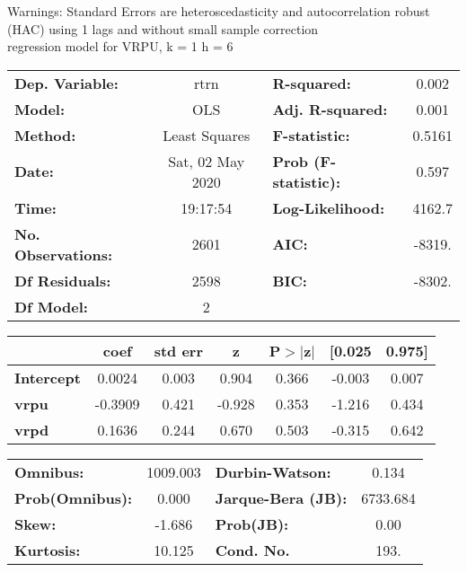 Warnings: \newline
 [1] Standard Errors are heteroscedasticity and autocorrelation robust (HAC) using 1 lags and without small sample correction\\ 

regression model for VRPU, k = 1 h = 6\begin{center}
\begin{tabular}{lclc}
\toprule
\textbf{Dep. Variable:}    &       rtrn       & \textbf{  R-squared:         } &     0.002   \\
\textbf{Model:}            &       OLS        & \textbf{  Adj. R-squared:    } &     0.001   \\
\textbf{Method:}           &  Least Squares   & \textbf{  F-statistic:       } &    0.5161   \\
\textbf{Date:}             & Sat, 02 May 2020 & \textbf{  Prob (F-statistic):} &    0.597    \\
\textbf{Time:}             &     19:17:54     & \textbf{  Log-Likelihood:    } &    4162.7   \\
\textbf{No. Observations:} &        2601      & \textbf{  AIC:               } &    -8319.   \\
\textbf{Df Residuals:}     &        2598      & \textbf{  BIC:               } &    -8302.   \\
\textbf{Df Model:}         &           2      & \textbf{                     } &             \\
\bottomrule
\end{tabular}
\begin{tabular}{lcccccc}
                   & \textbf{coef} & \textbf{std err} & \textbf{z} & \textbf{P$> |$z$|$} & \textbf{[0.025} & \textbf{0.975]}  \\
\midrule
\textbf{Intercept} &       0.0024  &        0.003     &     0.904  &         0.366        &       -0.003    &        0.007     \\
\textbf{vrpu}      &      -0.3909  &        0.421     &    -0.928  &         0.353        &       -1.216    &        0.434     \\
\textbf{vrpd}      &       0.1636  &        0.244     &     0.670  &         0.503        &       -0.315    &        0.642     \\
\bottomrule
\end{tabular}
\begin{tabular}{lclc}
\textbf{Omnibus:}       & 1009.003 & \textbf{  Durbin-Watson:     } &    0.134  \\
\textbf{Prob(Omnibus):} &   0.000  & \textbf{  Jarque-Bera (JB):  } & 6733.684  \\
\textbf{Skew:}          &  -1.686  & \textbf{  Prob(JB):          } &     0.00  \\
\textbf{Kurtosis:}      &  10.125  & \textbf{  Cond. No.          } &     193.  \\
\bottomrule
\end{tabular}
\end{center}

